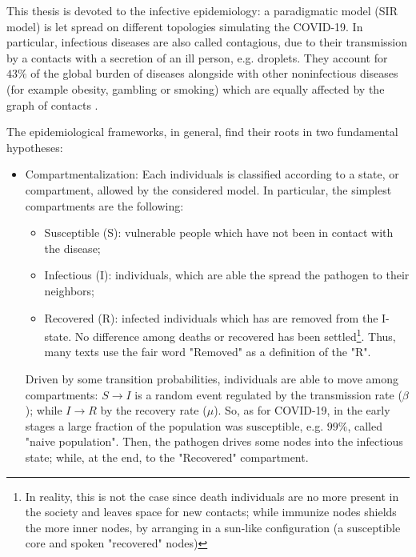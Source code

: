 \documentclass[a4paper,10pt,twoside]{book} %
\theoremstyle{definition}
\begin{document}
This thesis is devoted to the infective epidemiology: a paradigmatic model (SIR model) is let spread on different topologies simulating the COVID-19. In particular, infectious diseases are also called contagious, due to their transmission by a contacts with a secretion of an ill person, e.g. droplets. They account for $43\%$ of the global burden of diseases alongside with other noninfectious diseases (for example obesity, gambling or smoking) which are equally affected by the graph of contacts \cite{barabasi::2016networkbook}.

The epidemiological frameworks, in general, find their roots in two fundamental hypotheses:
\begin{itemize}
	\item Compartmentalization: Each individuals is classified according to a state, or compartment, allowed by the considered model. In particular, the simplest compartments are the following:
	\begin{itemize}
		\item Susceptible (S): vulnerable people which have not been in contact with the disease;
		\item Infectious (I): individuals, which are able the spread the pathogen to their neighbors;
		\item Recovered (R): infected individuals which has are removed from the I-state. No difference among deaths or recovered has been settled\footnote{In reality, this is not the case since death individuals are no more present in the society and leaves space for new contacts; while immunize nodes shields the more inner nodes, by arranging in a sun-like configuration (a susceptible core and spoken "recovered" nodes)}. Thus, many texts use the fair word "Removed" as a definition of the "R".
	\end{itemize}
	
	Driven by some transition probabilities, individuals are able to move among compartments: $S \rightarrow I$ is a random event regulated by the transmission rate ($\beta$); while $I \rightarrow R$ by the recovery rate ($\mu$). So, as for COVID-19, in the early stages a large fraction of the population was susceptible, e.g. $99\%$, called "naive population". Then, the pathogen drives some nodes into the infectious state; while, at the end, to the "Recovered" compartment.


\end{itemize}
\end{document}
